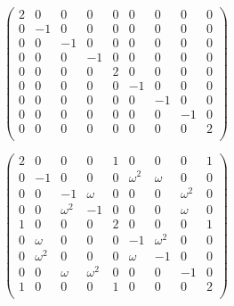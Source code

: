 \begin{figure}[ht]
    \begin{minipage}[t]{0.45\textwidth}
        \centering
        \[
            \begin{pmatrix}
                2 & 0  & 0  & 0  & 0 & 0 & 0 & 0 & 0 \\
                0 & -1 & 0  & 0  & 0 & 0 & 0 & 0 & 0 \\
                0 & 0  & -1 & 0  & 0 & 0 & 0 & 0 & 0 \\
                0 & 0  & 0  & -1 & 0 & 0 & 0 & 0 & 0 \\
                0 & 0  & 0  & 0  & 2 & 0 & 0 & 0 & 0 \\
                0 & 0  & 0  & 0  & 0 & -1 & 0 & 0 & 0 \\
                0 & 0  & 0  & 0  & 0 & 0 & -1 & 0 & 0 \\
                0 & 0  & 0  & 0  & 0 & 0 & 0 & -1 & 0 \\
                0 & 0  & 0  & 0  & 0 & 0 & 0 & 0 & 2 \\
            \end{pmatrix}
        \]
    \end{minipage}\hfill
    \begin{minipage}[t]{0.45\textwidth}
        \centering
        \[
            \begin{pmatrix}
                2 & 0  & 0  & 0  & 1 & 0 & 0 & 0 & 1 \\
                0 & -1 & 0  & 0  & 0 & \omega^2 & \omega & 0 & 0 \\
                0 & 0  & -1 & \omega  & 0 & 0 & 0 & \omega^2 & 0 \\
                0 & 0  & \omega^2  & -1 & 0 & 0 & 0 & \omega & 0 \\
                1 & 0  & 0  & 0  & 2 & 0 & 0 & 0 & 1 \\
                0 & \omega  & 0  & 0  & 0 & -1 & \omega^2 & 0 & 0 \\
                0 & \omega^2  & 0  & 0  & 0 & \omega & -1 & 0 & 0 \\
                0 & 0  & \omega  & \omega^2  & 0 & 0 & 0 & -1 & 0 \\
                1 & 0  & 0  & 0  & 1 & 0 & 0 & 0 & 2 \\
            \end{pmatrix}
        \]
    \end{minipage}


\end{figure}
